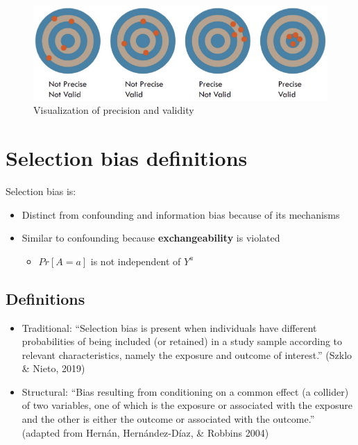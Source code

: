 \documentclass[
]{book}
\providecommand{\tightlist}{%
  \setlength{\itemsep}{0pt}\setlength{\parskip}{0pt}}
\begin{document}
\begin{figure}

{\centering \includegraphics[width=1\linewidth]{img/selection-bias/bullseyes} 

}

\caption{Visualization of precision and validity}\label{fig:unnamed-chunk-22}
\end{figure}

\hypertarget{selection-bias-definitions}{%
\section{Selection bias definitions}\label{selection-bias-definitions}}

Selection bias is:

\begin{itemize}
\tightlist
\item
  Distinct from confounding and information bias because of its mechanisms
\item
  Similar to confounding because \textbf{exchangeability} is violated

  \begin{itemize}
  \tightlist
  \item
    \(Pr[A=a]\) is not independent of \(Y^a\)
  \end{itemize}
\end{itemize}

\hypertarget{definitions-1}{%
\subsection{Definitions}\label{definitions-1}}

\begin{itemize}
\tightlist
\item
  Traditional: ``Selection bias is present when individuals have different probabilities of being included (or retained) in a study sample according to relevant characteristics, namely the exposure and outcome of interest.'' (Szklo \& Nieto, 2019)
\item
  Structural: ``Bias resulting from conditioning on a common effect (a collider) of two variables, one of which is the exposure or associated with the exposure and the other is either the outcome or associated with the outcome.'' (adapted from Hernán, Hernández-Díaz, \& Robbins 2004)
\end{itemize}
\end{document}
